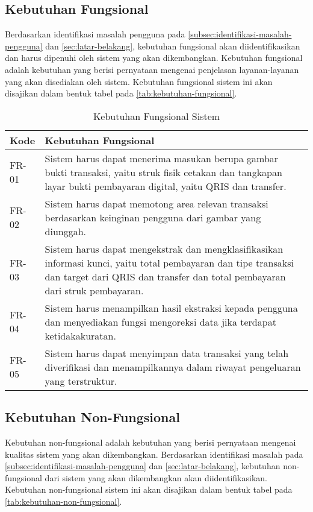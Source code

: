 \subsection{Kebutuhan Fungsional}
\label{subsec:kebutuhan-fungsional}
Berdasarkan identifikasi masalah pengguna pada \autoref{subsec:identifikasi-masalah-pengguna} dan \autoref{sec:latar-belakang}, kebutuhan fungsional akan diidentifikasikan dan harus dipenuhi oleh sistem yang akan dikembangkan. Kebutuhan fungsional adalah kebutuhan yang berisi pernyataan mengenai 
penjelasan layanan-layanan yang akan disediakan oleh sistem. Kebutuhan fungsional sistem ini akan disajikan dalam bentuk tabel pada \autoref{tab:kebutuhan-fungsional}.

\begin{table}[h!]
\caption{Kebutuhan Fungsional Sistem}
\label{tab:kebutuhan-fungsional}
\begin{tabularx}{\linewidth}{|l|X|}
\hline
\textbf{Kode} & \textbf{Kebutuhan Fungsional} \\
\hline
FR-01 & Sistem harus dapat menerima masukan berupa gambar bukti transaksi, yaitu struk fisik cetakan dan tangkapan layar bukti pembayaran digital, yaitu QRIS dan transfer. \\
\hline
FR-02 & Sistem harus dapat memotong area relevan transaksi berdasarkan \newline keinginan pengguna dari gambar yang diunggah. \\
\hline
FR-03 & Sistem harus dapat mengekstrak dan mengklasifikasikan informasi \newline kunci, yaitu total pembayaran dan tipe transaksi dan target dari QRIS dan transfer dan total pembayaran dari struk pembayaran. \\
\hline
FR-04 & Sistem harus menampilkan hasil ekstraksi kepada pengguna dan menyediakan fungsi mengoreksi data jika terdapat ketidakakuratan. \\
\hline
FR-05 & Sistem harus dapat menyimpan data transaksi yang telah diverifikasi dan menampilkannya dalam riwayat pengeluaran yang terstruktur. \\
\hline
\end{tabularx}
\end{table}

\subsection{Kebutuhan Non-Fungsional}
\label{subsec:kebutuhan-non-fungsional}
Kebutuhan non-fungsional adalah kebutuhan yang berisi pernyataan mengenai kualitas sistem yang akan dikembangkan. Berdasarkan identifikasi masalah pada \autoref{subsec:identifikasi-masalah-pengguna} dan \autoref{sec:latar-belakang}, kebutuhan non-fungsional dari sistem yang akan dikembangkan akan diidentifikasikan. Kebutuhan non-fungsional sistem ini akan disajikan dalam bentuk tabel pada \autoref{tab:kebutuhan-non-fungsional}.

